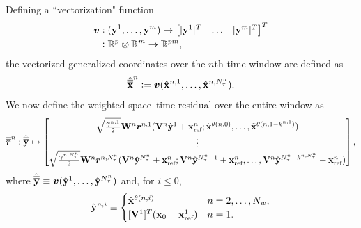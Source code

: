 Defining a ``vectorization" function 
\begin{align*}
 \boldsymbol v &\vcentcolon (\mathbf{y}^{1},\ldots,\mathbf{y}^{m} ) \mapsto \begin{bmatrix} [\mathbf{y}^{1}]^T & \ldots & [\mathbf{y}^{m}]^T \end{bmatrix}^T  \\
&\vcentcolon \mathbb{R}^{p} \otimes \mathbb{R}^{m} \rightarrow \mathbb{R}^{pm},
\end{align*}
the vectorized generalized coordinates over the $n$th time window are 
defined as 
\begin{equation*}
\hat{\overline{\overline{\mathbf {x}}}}^{n} \vcentcolon= 
\boldsymbol v (\hat{\mathbf{x}}^{n,1},\ldots,\hat{\mathbf{x}}^{n,N_{\tau}^{n}} ).
\end{equation*}
We now define the weighted space--time residual over the entire window as
\begin{equation*}
\overline{\overline{\boldsymbol r}}^{n}_{\text{}} : \hat{\overline{\overline{\mathbf{y}}}}^{} \mapsto \begin{bmatrix}
 \sqrt{\frac{\gamma^{n,1}}{2}} \mathbf{W}^{n} \boldsymbol r_{}^{n,1}( \mathbf {V}^{n} \hat{\mathbf{y}}^{1} + \mathbf{x}_\text{ref}^{n}; 
 \tilde{\mathbf{x}}^{\theta(n,0)},
\ldots , \tilde{\mathbf{x}}^{\theta(n,1 - k^{n,1}) }   ) \\
\vdots \\
 \sqrt{\frac{\gamma^{n,N_{\tau}^{n}}}{2}} \mathbf{W}^{n} \boldsymbol r_{}^{n,N_{\tau}^{n}}( \mathbf {V}^{n} \hat{\mathbf{y}}^{N_{\tau}^{n}} + \mathbf{x}_\text{ref}^{n}; \mathbf {V}^{n} \hat{\mathbf{y}}^{N_{\tau}^{n}-1} + \mathbf{x}_\text{ref}^{n} ,  \ldots, \mathbf {V}^{n} \hat{\mathbf{y}}^{N_{\tau}^{n} - k^{n,N_{\tau}^{n}} } + \mathbf{x}_\text{ref}^{n} ) \\
\end{bmatrix},
\end{equation*}
where $\hat{\overline{\overline{\mathbf{y}}}}^{} \equiv \boldsymbol v (\hat{\mathbf{y}}^{1},\ldots,\hat{\mathbf{y}}^{N_{\tau}^{n}} )$ and, for $i \le 0$,
\begin{equation}\label{eq:wls_genspatial_direct_args}
\genstateyDiscreteArgnt{n,i}  \equiv 
\begin{cases}
\genstateDiscreteArg{\indexMapper(n,i)}  & n = 2,\ldots,\nslabs,  \\
\genstateICOne  & n = 1. 
\end{cases}
\end{equation}
